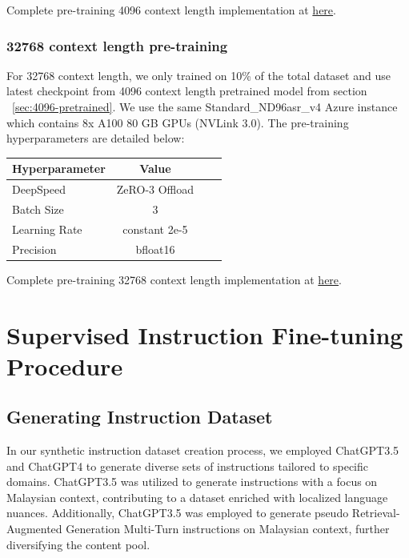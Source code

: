 \documentclass{article}
\begin{document}
Complete pre-training 4096 context length implementation at \href{https://github.com/mesolitica/malaya/tree/5.1/session/mistral#7b-4096-context-length}{here}.

\subsubsection{32768 context length pre-training}\label{sec:32768-pretrained}

For 32768 context length, we only trained on 10\% of the total dataset and use latest checkpoint from 4096 context length pretrained model from section ~\ref{sec:4096-pretrained}. We use the same Standard\_ND96asr\_v4 Azure instance which contains 8x A100 80 GB GPUs (NVLink 3.0). The pre-training hyperparameters are detailed below:

\begin{table}[h]
  \centering
  \begin{tabular}{lccl}
    \hline
    \textbf{Hyperparameter} & \textbf{Value} \\
    \hline
    DeepSpeed               & ZeRO-3 Offload \\
    Batch Size              & 3              \\
    Learning Rate           & constant 2e-5  \\
    Precision               & bfloat16       \\
    \hline
  \end{tabular}
\end{table}

Complete pre-training 32768 context length implementation at \href{https://github.com/mesolitica/malaya/tree/5.1/session/mistral#7b-32768-context-length}{here}.


\section{Supervised Instruction Fine-tuning Procedure}

\subsection{Generating Instruction Dataset}\label{sec:generating-instruction-dataset}

In our synthetic instruction dataset creation process, we employed ChatGPT3.5 and ChatGPT4 to generate diverse sets of instructions tailored to specific domains. ChatGPT3.5 was utilized to generate instructions with a focus on Malaysian context, contributing to a dataset enriched with localized language nuances. Additionally, ChatGPT3.5 was employed to generate pseudo Retrieval-Augmented Generation Multi-Turn instructions on Malaysian context, further diversifying the content pool.
\end{document}

